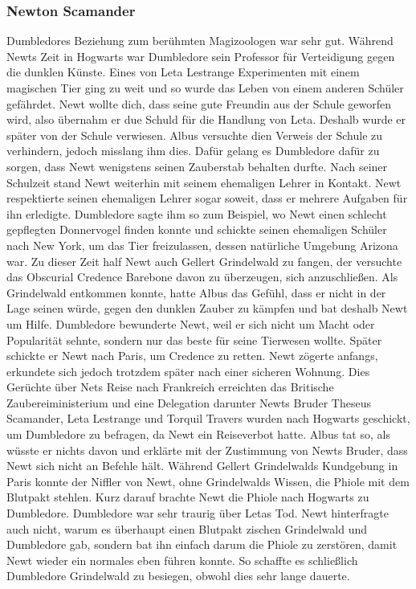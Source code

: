 \documentclass[a4paper, 10pt]{article}
\begin{document}
\subsubsection*{\large Newton Scamander}
Dumbledores Beziehung zum berühmten Magizoologen war sehr gut. Während Newts Zeit in Hogwarts war Dumbledore sein Professor für Verteidigung gegen die dunklen Künste. Eines von Leta Lestrange Experimenten mit einem magischen Tier ging zu
weit und so wurde das Leben von einem anderen Schüler gefährdet. Newt wollte dich, dass seine gute Freundin aus der Schule geworfen wird, also übernahm er due Schuld für die Handlung von Leta. Deshalb wurde er später von der Schule verwiesen. Albus versuchte dien Verweis der Schule zu verhindern, jedoch misslang ihm dies. Dafür gelang es Dumbledore dafür zu sorgen, dass Newt wenigstens seinen Zauberstab behalten durfte. Nach seiner Schulzeit stand Newt weiterhin mit seinem ehemaligen Lehrer in Kontakt. Newt respektierte seinen ehemaligen Lehrer sogar soweit, dass er mehrere Aufgaben für ihn erledigte. Dumbledore sagte ihm so zum Beispiel, wo Newt einen schlecht gepflegten Donnervogel finden konnte und schickte seinen ehemaligen Schüler nach New York, um das Tier freizulassen, dessen natürliche Umgebung Arizona war. Zu dieser Zeit half Newt auch Gellert Grindelwald zu fangen, der versuchte das Obscurial Credence Barebone davon zu überzeugen, sich anzuschließen. Als Grindelwald entkommen konnte, hatte Albus das Gefühl, dass er nicht in der Lage seinen würde, gegen den dunklen Zauber zu kämpfen und bat deshalb Newt um Hilfe. Dumbledore bewunderte Newt, weil er sich nicht um Macht oder Popularität sehnte, sondern nur das beste für seine Tierwesen wollte. Später schickte er Newt nach Paris, um Credence zu retten. Newt zögerte anfangs, erkundete sich jedoch trotzdem später nach einer sicheren Wohnung. Dies Gerüchte über Nets Reise nach Frankreich erreichten das Britische Zaubereiministerium und eine Delegation darunter Newts Bruder Theseus Scamander, Leta Lestrange und Torquil Travers wurden nach Hogwarts geschickt, um Dumbledore zu befragen, da Newt ein Reiseverbot hatte. Albus tat so, als wüsste er nichts davon und erklärte mit der Zustimmung von Newts Bruder, dass Newt sich nicht an Befehle hält. Während Gellert Grindelwalds Kundgebung in Paris konnte der Niffler von Newt, ohne Grindelwalds Wissen, die Phiole mit dem Blutpakt stehlen. Kurz darauf brachte Newt die Phiole nach Hogwarts zu Dumbledore. Dumbledore war sehr traurig über Letas Tod. Newt hinterfragte auch nicht, warum es überhaupt einen Blutpakt zischen Grindelwald und Dumbledore gab, sondern bat ihn einfach darum die Phiole zu zerstören, damit Newt wieder ein normales eben führen konnte. So schaffte es schließlich Dumbledore Grindelwald zu besiegen, obwohl dies sehr lange dauerte.
\end{document}
